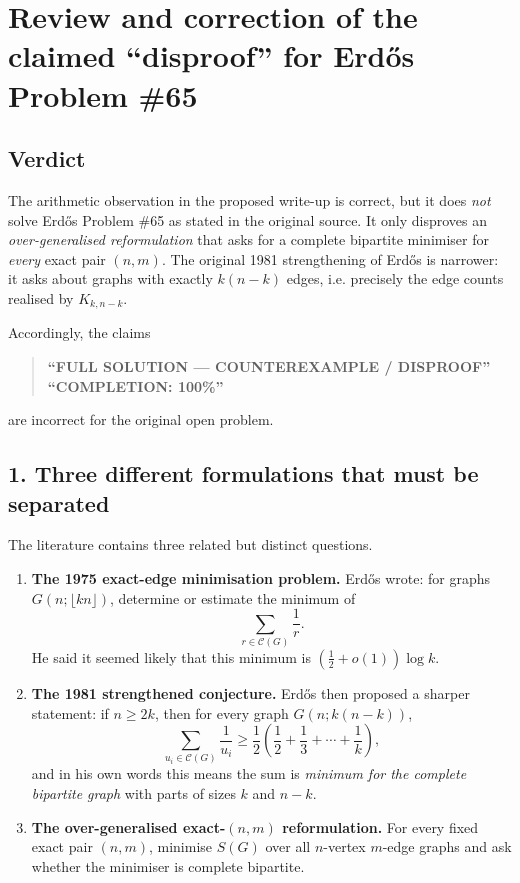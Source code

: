 \section{Review and correction of the claimed ``disproof'' for Erd\H{o}s Problem \#65}

\subsection*{Verdict}

The arithmetic observation in the proposed write-up is correct, but it does \emph{not} solve Erd\H{o}s Problem \#65 as stated in the original source. It only disproves an \emph{over-generalised reformulation} that asks for a complete bipartite minimiser for \emph{every} exact pair $(n,m)$. The original 1981 strengthening of Erd\H{o}s is narrower: it asks about graphs with exactly $k(n-k)$ edges, i.e. precisely the edge counts realised by $K_{k,n-k}$.

Accordingly, the claims
\begin{quote}
\textbf{``FULL SOLUTION --- COUNTEREXAMPLE / DISPROOF''}
\qquad{}\qquad
\textbf{``COMPLETION: 100\%''}
\end{quote}
are incorrect for the original open problem.

\subsection*{1. Three different formulations that must be separated}

The literature contains three related but distinct questions.

\begin{enumerate}
\item[(A)] \textbf{The 1975 exact-edge minimisation problem.}
Erd\H{o}s wrote: for graphs $G(n;\lfloor kn\rfloor)$, determine or estimate the minimum of
\[
\sum_{r\in \mathcal C(G)} \frac1r.
\]
He said it seemed likely that this minimum is $(\tfrac12+o(1))\log k$.

\item[(B)] \textbf{The 1981 strengthened conjecture.}
Erd\H{o}s then proposed a sharper statement: if $n\ge 2k$, then for every graph $G(n;k(n-k))$,
\[
\sum_{u_i\in \mathcal C(G)} \frac1{u_i}
\ge \frac12\left(\frac12+\frac13+\cdots+\frac1k\right),
\]
and in his own words this means the sum is \emph{minimum for the complete bipartite graph} with parts of sizes $k$ and $n-k$.

\item[(C)] \textbf{The over-generalised exact-$(n,m)$ reformulation.}
For every fixed exact pair $(n,m)$, minimise $S(G)$ over all $n$-vertex $m$-edge graphs and ask whether the minimiser is complete bipartite.
\end{enumerate}

